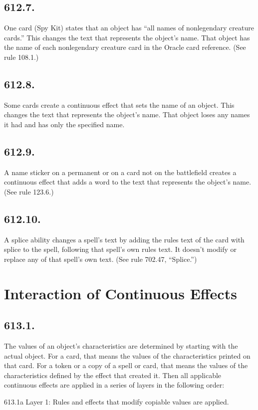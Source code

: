 \subsection*{612.7.}
One card (Spy Kit) states that an object has “all names of nonlegendary creature cards.” This changes the text that represents the object’s name. That object has the name of each nonlegendary creature card in the Oracle card reference. (See rule 108.1.)

\subsection*{612.8.}
Some cards create a continuous effect that sets the name of an object. This changes the text that represents the object’s name. That object loses any names it had and has only the specified name.

\subsection*{612.9.}
A name sticker on a permanent or on a card not on the battlefield creates a continuous effect that adds a word to the text that represents the object’s name. (See rule 123.6.)

\subsection*{612.10.}
A splice ability changes a spell’s text by adding the rules text of the card with splice to the spell, following that spell’s own rules text. It doesn’t modify or replace any of that spell’s own text. (See rule 702.47, “Splice.”)

\section{Interaction of Continuous Effects}
\subsection*{613.1.}
The values of an object’s characteristics are determined by starting with the actual object. For a card, that means the values of the characteristics printed on that card. For a token or a copy of a spell or card, that means the values of the characteristics defined by the effect that created it. Then all applicable continuous effects are applied in a series of layers in the following order:

613.1a Layer 1: Rules and effects that modify copiable values are applied.

